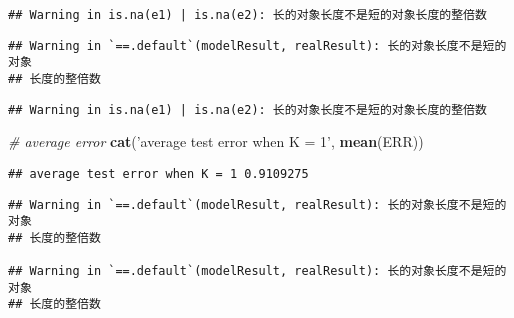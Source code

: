\documentclass[]{article}
\newenvironment{Shaded}{\begin{snugshade}}{\end{snugshade}}
\newcommand{\CommentTok}[1]{\textcolor[rgb]{0.56,0.35,0.01}{\textit{#1}}}
\newcommand{\ControlFlowTok}[1]{\textcolor[rgb]{0.13,0.29,0.53}{\textbf{#1}}}
\newcommand{\DataTypeTok}[1]{\textcolor[rgb]{0.13,0.29,0.53}{#1}}
\newcommand{\DecValTok}[1]{\textcolor[rgb]{0.00,0.00,0.81}{#1}}
\newcommand{\KeywordTok}[1]{\textcolor[rgb]{0.13,0.29,0.53}{\textbf{#1}}}
\newcommand{\NormalTok}[1]{#1}
\newcommand{\OperatorTok}[1]{\textcolor[rgb]{0.81,0.36,0.00}{\textbf{#1}}}
\newcommand{\StringTok}[1]{\textcolor[rgb]{0.31,0.60,0.02}{#1}}
\begin{document}
\begin{verbatim}
## Warning in is.na(e1) | is.na(e2): 长的对象长度不是短的对象长度的整倍数
\end{verbatim}

\begin{verbatim}
## Warning in `==.default`(modelResult, realResult): 长的对象长度不是短的对象
## 长度的整倍数
\end{verbatim}

\begin{verbatim}
## Warning in is.na(e1) | is.na(e2): 长的对象长度不是短的对象长度的整倍数
\end{verbatim}

\begin{Shaded}
\begin{Highlighting}[]
\CommentTok{# average error}
\KeywordTok{cat}\NormalTok{(}\StringTok{'average test error when K = 1'}\NormalTok{, }\KeywordTok{mean}\NormalTok{(ERR))}
\end{Highlighting}
\end{Shaded}

\begin{verbatim}
## average test error when K = 1 0.9109275
\end{verbatim}

\begin{Shaded}
\end{Shaded}

\begin{verbatim}
## Warning in `==.default`(modelResult, realResult): 长的对象长度不是短的对象
## 长度的整倍数

## Warning in `==.default`(modelResult, realResult): 长的对象长度不是短的对象
## 长度的整倍数
\end{verbatim}
\end{document}
